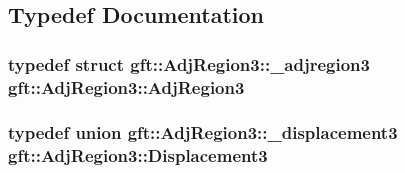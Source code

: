\subsection{Typedef Documentation}
\hypertarget{namespacegft_1_1AdjRegion3_a50e41e32ed23c8a2c4027f2ea29d501b}{
\subsubsection[{Adj\-Region3}]{\setlength{\rightskip}{0pt plus 5cm}typedef struct {\bf gft\-::\-Adj\-Region3\-::\-\_\-adjregion3}  {\bf gft\-::\-Adj\-Region3\-::\-Adj\-Region3}}}\label{namespacegft_1_1AdjRegion3_a50e41e32ed23c8a2c4027f2ea29d501b}
\hypertarget{namespacegft_1_1AdjRegion3_a36e3b3c33b2dfaebe493f4abf791ee4c}{
\subsubsection[{Displacement3}]{\setlength{\rightskip}{0pt plus 5cm}typedef union {\bf gft\-::\-Adj\-Region3\-::\-\_\-displacement3}  {\bf gft\-::\-Adj\-Region3\-::\-Displacement3}}}\label{namespacegft_1_1AdjRegion3_a36e3b3c33b2dfaebe493f4abf791ee4c}


